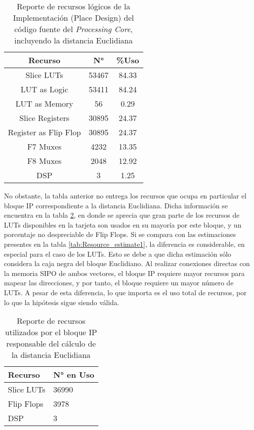 \documentclass[conference]{IEEEtran}
\begin{document}
\begin{table}[!ht]
\centering
\caption{Reporte de recursos lógicos de la Implementación (Place Design) del código fuente del \textit{Processing Core}, incluyendo la distancia Euclidiana}
\label{tab:IMP_vivado}
\begin{tabular}{c|c|c}
\hline
\multicolumn{1}{c|}{Recurso}  & N°&\%Uso  \\ \hline
Slice LUTs    &  53467 & 84.33    \\ \hline
LUT as Logic    & 53411 & 84.24   \\ \hline
LUT as Memory    & 56 & 0.29   \\ \hline
Slice Registers & 30895 & 24.37     \\ \hline
Register as Flip Flop & 30895 & 24.37     \\ \hline
F7 Muxes & 4232 & 13.35       \\ \hline
F8 Muxes           & 2048 & 12.92         \\ \hline
DSP           & 3    & 1.25      \\ \hline

\end{tabular}
\end{table}

No obstante, la tabla anterior no entrega los recursos que ocupa en particular el bloque IP correspondiente a la distancia Euclidiana. Dicha información se encuentra en la tabla \ref{tab:EUC_resource_only}, en donde se aprecia que gran parte de los recursos de LUTs disponibles en la tarjeta son usados en su mayoría por este bloque, y un porcentaje no despreciable de Flip Flops. Si se compara con las estimaciones presentes en la tabla \ref{tab:Resource_estimate1}, la diferencia es considerable, en especial para el caso de los LUTs. Esto se debe a que dicha estimación sólo considera la caja negra del bloque Euclidiano. Al realizar conexiones directas con la memoria SIPO de ambos vectores, el bloque IP requiere mayor recursos para mapear las direcciones, y por tanto, el bloque requiere un mayor número de LUTs. A pesar de esta diferencia, lo que importa es el uso total de recursos, por lo que la hipótesis sigue siendo válida.

\begin{table}[!ht]
    \centering
    \caption{Reporte de recursos utilizados por el bloque IP responsable del cálculo de la distancia Euclidiana}
    \label{tab:EUC_resource_only}
    \begin{tabular}{|l|l|}
    \hline
        Recurso & N° en Uso \\ \hline
        Slice LUTs & 36990 \\ \hline
        Flip Flops & 3978 \\ \hline
        DSP & 3 \\ \hline
    \end{tabular}
\end{table}
\end{document}

